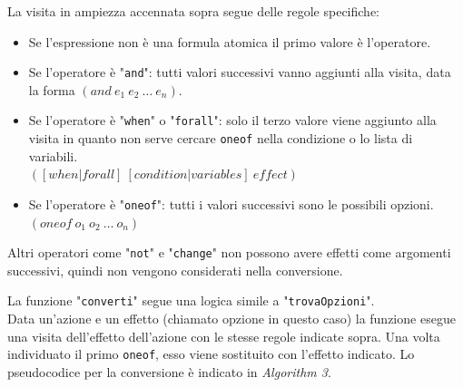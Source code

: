 \documentclass[a4paper, 11pt, titlepage, twoside, openany]{book}
\begin{document}
La visita in ampiezza accennata sopra segue delle regole specifiche:
\begin{itemize}
    \item Se l'espressione non è una formula atomica il primo valore è l'operatore.
    \item Se l'operatore è "\texttt{and}": tutti valori successivi vanno aggiunti alla visita, data la forma $(and\ e_1\ e_2\ \dots\ e_n)$.
    \item Se l'operatore è "\texttt{when}" o "\texttt{forall}": solo il terzo valore viene aggiunto alla visita in quanto non serve cercare \texttt{oneof} nella condizione o lo lista di variabili. \\ 
    $([when|forall]\ [condition|variables]\ effect)$
    \item Se l'operatore è "\texttt{oneof}": tutti i valori successivi sono le possibili opzioni. $(oneof\ o_1\ o_2\ \dots\ o_n)$
\end{itemize}
Altri operatori come "\texttt{not}" e "\texttt{change}" non possono avere effetti come argomenti successivi, quindi non vengono considerati nella conversione.

\begin{algorithm}
\caption{Individuazione delle opzioni del primo oneof con visita in ampiezza}\label{alg:findOneof}
\end{algorithm}

La funzione "\texttt{converti}" segue una logica simile a "\texttt{trovaOpzioni}". \\
Data un'azione e un effetto (chiamato opzione in questo caso) la funzione esegue una visita dell'effetto dell'azione con le stesse regole indicate sopra. Una volta individuato il primo \texttt{oneof}, esso viene sostituito con l'effetto indicato. Lo pseudocodice per la conversione è indicato in \textit{Algorithm 3}.
\end{document}
